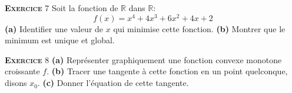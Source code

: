 \documentclass[10pt,a4paper,notitlepage,twocolumn]{article}
\newcommand{\exercise}[1]{\textsc{\textbf{Exercice}} #1}
\newcommand{\question}[1]{\textbf{(#1)}}
\begin{document}
\bigskip

\exercise{7} Soit la fonction de $\mathbb R$ dans $\mathbb R$:
\[
f(x) = x^{4}+4x^{3}+6x^{2}+4x+2
\]
\question{a} Identifier une valeur de $x$ qui minimise cette
fonction. \question{b} Montrer que le minimum est unique et global.

\bigskip

\exercise{8} \question{a} Représenter graphiquement une fonction convexe monotone croissante $f$. \question{b} Tracer une tangente à cette fonction en un point quelconque, disons $x_{0}$. \question{c} Donner l'équation de cette tangente.
\end{document}
